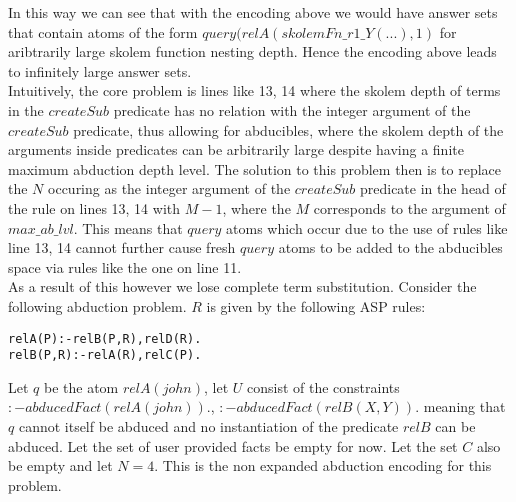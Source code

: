 \documentclass{article}
\begin{document}
In this way we can see that with the encoding above we would have answer sets that contain atoms of the form $query(relA(skolemFn\_r1\_Y(...),1)$ for aribtrarily large skolem function nesting depth. Hence the encoding above leads to infinitely large answer sets.\\
\newline
Intuitively, the core problem is lines like 13, 14 where the skolem depth of terms in the $createSub$ predicate has no relation with the integer argument of the $createSub$ predicate, thus allowing for abducibles, where the skolem depth of the arguments inside predicates can be arbitrarily large despite having a finite maximum abduction depth level. The solution to this problem then is to replace the $N$ occuring as the integer argument of the $createSub$ predicate in the head of the rule on lines 13, 14 with $M-1$, where the $M$ corresponds to the argument of $max\_ab\_lvl$. This means that $query$ atoms which occur due to the use of rules like line 13, 14 cannot further cause fresh $query$ atoms to be added to the abducibles space via rules like the one on line 11.\\
\newline
As a result of this however we lose complete term substitution. Consider the following abduction problem. $R$ is given by the following ASP rules:
\begin{verbatim}
relA(P):-relB(P,R),relD(R).
relB(P,R):-relA(R),relC(P).
\end{verbatim}
Let $q$ be the atom $relA(john)$, let $U$ consist of the constraints $:-abducedFact(relA(john)).$, $:-abducedFact(relB(X,Y)).$ meaning that $q$ cannot itself be abduced and no instantiation of the predicate $relB$ can be abduced. Let the set of user provided facts be empty for now. Let the set $C$ also be empty and let $N = 4$. This is the non expanded abduction encoding for this problem. 
\end{document}
